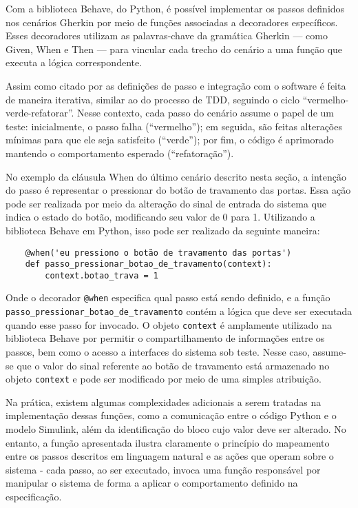 Com a biblioteca Behave, do Python, é possível implementar os passos definidos nos cenários Gherkin por meio de funções associadas a decoradores específicos. 
Esses decoradores utilizam as palavras-chave da gramática Gherkin — como Given, When e Then — para vincular cada trecho do cenário a uma função que executa a 
lógica correspondente.

Assim como citado por \cite{studyBDD} as definições de passo e integração com o software é feita de maneira iterativa, similar ao do processo de TDD, seguindo o ciclo 
“vermelho-verde-refatorar”. Nesse contexto, cada passo do cenário assume o papel de um teste: inicialmente, o passo falha (“vermelho”); em seguida, são feitas alterações 
mínimas para que ele seja satisfeito (“verde”); por fim, o código é aprimorado mantendo o comportamento esperado (“refatoração”).

No exemplo da cláusula When do último cenário descrito nesta seção, a intenção do passo é representar o pressionar do botão de travamento das portas. Essa ação pode 
ser realizada por meio da alteração do sinal de entrada do sistema que indica o estado do botão, modificando seu valor de 0 para 1. Utilizando a biblioteca Behave em 
Python, isso pode ser realizado da seguinte maneira:

\begin{verbatim}
	@when('eu pressiono o botão de travamento das portas')
	def passo_pressionar_botao_de_travamento(context):
		context.botao_trava = 1
\end{verbatim}

Onde o decorador \texttt{@when} especifica qual passo está sendo definido, e a função \texttt{passo\_pressionar\_botao\_de\_travamento} contém a lógica que deve ser executada quando 
esse passo for invocado. O objeto \texttt{context} é amplamente utilizado na biblioteca Behave por permitir o compartilhamento de informações entre os passos, bem como o 
acesso a interfaces do sistema sob teste. Nesse caso, assume-se que o valor do sinal referente ao botão de travamento está armazenado no objeto \texttt{context} e pode ser 
modificado por meio de uma simples atribuição.

Na prática, existem algumas complexidades adicionais a serem tratadas na implementação dessas funções, como a comunicação entre o código Python e o modelo Simulink, 
além da identificação do bloco cujo valor deve ser alterado. No entanto, a função apresentada ilustra claramente o princípio do mapeamento entre os passos descritos 
em linguagem natural e as ações que operam sobre o sistema - cada passo, ao ser executado, invoca uma função responsável por manipular o sistema de forma a aplicar o 
comportamento definido na especificação.

